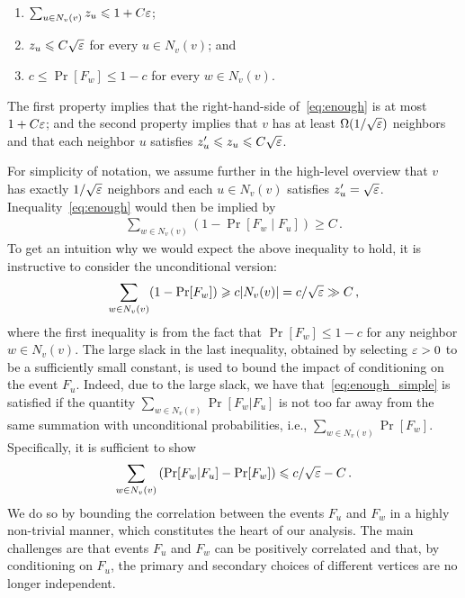 \begin{enumerate}
  \item $\sum_{u\in
    N_v(v)} z_u \leqslant 1+ C\varepsilon$;
  \item $z_u \leqslant C\sqrt{\varepsilon}$ for every $u\in N_v(v)$; and
  \item $c \leq \Pr[F_w]  \leq 1-c$ for every $w\in N_{v}(v)$.
\end{enumerate}
The first property implies that the right-hand-side of~\eqref{eq:enough} is at most $1 + C\varepsilon$; and the second property implies that $v$ has at least $\Omega(1/\sqrt{\varepsilon})$ neighbors and that each neighbor $u$ satisfies $z'_u \leqslant z_u \leqslant C\sqrt{\varepsilon}$. 

For simplicity of notation, we assume further in the high-level  overview  that $v$ has exactly $1/\sqrt{\varepsilon}$ neighbors and each $u\in N_v(v)$ satisfies $z'_u = \sqrt{\varepsilon}$. Inequality~\eqref{eq:enough} would then be implied by
\begin{align}
 \sum_{w\in N_v(v)}   (1-\Pr[F_w \mid F_u])  \geq  C\,.
 \label{eq:enough_simple}
\end{align}
To get an intuition why we would expect the above inequality to hold, it is instructive to consider the unconditional version:
\begin{align*}
  \sum_{w\in N_v(v)}   (1-\Pr[F_w ]) \geqslant c |N_v(v)| = c/\sqrt{\varepsilon} \gg C \,,
\end{align*}
where the first inequality is from the fact that  $\Pr[F_w] \leq 1-c$ for any neighbor $w\in N_v(v)$. The large slack  in the last inequality, obtained by selecting $\varepsilon>0$ to be a sufficiently small constant, is used to bound the impact of conditioning on the event $F_u$. Indeed, due to the large slack, we  have that~\eqref{eq:enough_simple} is satisfied if the quantity  $\sum_{w \in N_v(v)}\Pr[F_w|F_u]$ is not too  far away from the same summation with unconditional 
probabilities, i.e., $\sum_{w \in N_v(v)} \Pr[F_w]$.  Specifically, it is sufficient to show
\begin{align}
  \sum_{w \in N_v(v)}\left(\Pr[F_w|F_u] - \Pr[F_w]\right) \leqslant c/\sqrt{\varepsilon} - C \,.
  \label{eq:simpleFsum}
\end{align}
We do so by bounding the correlation between the events $F_u$ and $F_w$ in a highly non-trivial manner, 
which constitutes the heart of our analysis.
The main challenges are that  events $F_u$  and $F_w$ can be positively correlated and that, by conditioning on $F_u$, the primary and secondary choices of different vertices are no longer independent. 

